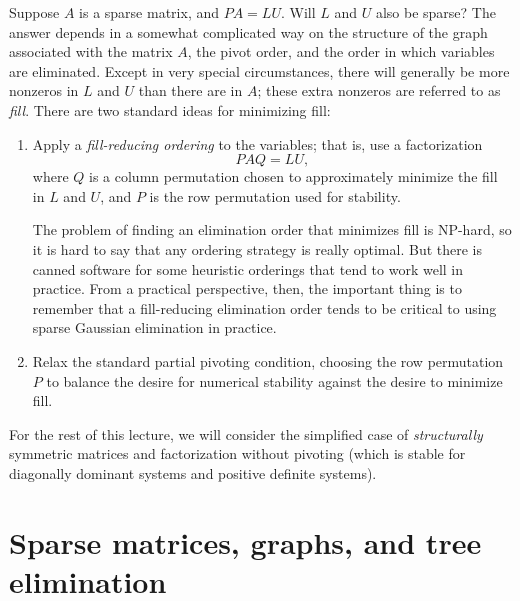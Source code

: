 \documentclass[12pt, leqno]{article}
\begin{document}
Suppose $A$ is a sparse matrix, and $PA = LU$.  Will $L$ and $U$ also
be sparse?  The answer depends in a somewhat complicated way on the
structure of the graph associated with the matrix $A$, the pivot
order, and the order in which variables are eliminated.  Except in
very special circumstances, there will generally be more nonzeros in
$L$ and $U$ than there are in $A$; these extra nonzeros are referred
to as {\em fill}.  There are two standard ideas for minimizing fill:
\begin{enumerate}
\item
  Apply a {\em fill-reducing ordering} to the variables; that is,
  use a factorization
  \[
    PAQ = LU,
  \]
  where $Q$ is a column permutation chosen to approximately minimize
  the fill in $L$ and $U$, and $P$ is the row permutation used for
  stability.

  The problem of finding an elimination order that minimizes fill is
  NP-hard, so it is hard to say that any ordering strategy is really
  optimal.  But there is canned software for some heuristic orderings
  that tend to work well in practice.  From a practical perspective,
  then, the important thing is to remember that a fill-reducing
  elimination order tends to be critical to using sparse Gaussian
  elimination in practice.
\item
  Relax the standard partial pivoting condition, choosing the row
  permutation $P$ to balance the desire for numerical stability
  against the desire to minimize fill.
\end{enumerate}

For the rest of this lecture, we will consider the simplified case of
{\em structurally} symmetric matrices and factorization without
pivoting (which is stable for diagonally dominant systems and positive
definite systems).

\section{Sparse matrices, graphs, and tree elimination}
\end{document}
